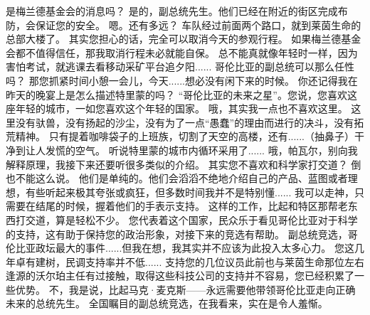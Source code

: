\documentclass[openany]{book}
\begin{document}
\begin{dialogue}
     是梅兰德基金会的消息吗？
     是的，副总统先生。他们已经在附近的街区完成布防，会保证您的安全。
     嗯。还有多远？
     车队经过前面两个路口，就到莱茵生命的总部大楼了。
     其实您担心的话，完全可以取消今天的参观行程。
     如果梅兰德基金会都不值得信任，那我取消行程未必就能自保。
     总不能真就像年轻时一样，因为害怕考试，就逃课去看移动采矿平台追夕阳......
     哥伦比亚的副总统可以那么任性吗？
     那您抓紧时间小憩一会儿，今天......想必没有闲下来的时候。
     你还记得我在昨天的晚宴上是怎么描述特里蒙的吗？
     “哥伦比亚的未来之星”。您说，您喜欢这座年轻的城市，一如您喜欢这个年轻的国家。
     哦，其实我一点也不喜欢这里。
     这里没有驮兽，没有扬起的沙尘，没有为了一点“愚蠢”的理由而进行的决斗，没有拓荒精神。
     只有提着咖啡袋子的上班族，切割了天空的高楼，还有......（抽鼻子）干净到让人发慌的空气。
     听说特里蒙的城市内循环采用了......
     哦，帕瓦尔，别向我解释原理，我接下来还要听很多类似的介绍。
     其实您不喜欢和科学家打交道？
     倒也不能这么说。
     他们是单纯的。他们会滔滔不绝地介绍自己的产品、蓝图或者理想，有些听起来极其夸张或疯狂，但多数时间我并不是特别懂......
     我可以走神，只需要在结尾的时候，握着他们的手表示支持。
     这样的工作，比起和特区那帮老东西打交道，算是轻松不少。
     您代表着这个国家，民众乐于看见哥伦比亚对于科学的支持，这有助于保持您的政治形象，对接下来的竞选有帮助。
     副总统竞选，哥伦比亚政坛最大的事件......但我在想，我其实并不应该为此投入太多心力。
     您这几年卓有建树，民调支持率并不低......
     支持您的几位议员此前也与莱茵生命那位左右逢源的沃尔珀主任有过接触，取得这些科技公司的支持并不容易，您已经积累了一些优势。
     不，我是说，比起马克·麦克斯——永远需要他带领哥伦比亚走向正确未来的总统先生。
     全国瞩目的副总统竞选，在我看来，实在是令人羞惭。
\end{dialogue}
\end{document}
